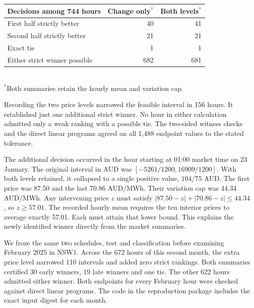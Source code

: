 \begin{center}
\begin{tabular}{lrr}
\toprule
Decisions among 744 hours & Change only$^*$ & Both levels$^*$\\
\midrule
First half strictly better & 40 & 41\\
Second half strictly better & 21 & 21\\
Exact tie & 1 & 1\\
Either strict winner possible & 682 & 681\\
\bottomrule
\end{tabular}\\[3pt]
{\small $^*$Both summaries retain the hourly mean and variation cap.}
\end{center}

Recording the two price levels narrowed the feasible interval in 156 hours. It established just one additional strict winner. No hour in either calculation admitted only a weak ranking with a possible tie. The two-sided witness checks and the direct linear programs agreed on all 1,488 endpoint values to the stated tolerance.

The additional decision occurred in the hour starting at 01:00 market time on 23 January. The original interval in AUD was $[-5261/1200,16909/1200]$. With both levels retained, it collapsed to a single positive value, $104/75$ AUD. The first price was 87.50 and the last 70.86 AUD/MWh. Their variation cap was 44.34 AUD/MWh. Any intervening price $z$ must satisfy $|87.50-z|+|70.86-z|\le44.34$, so $z\ge57.01$. The recorded hourly mean requires the ten interior prices to average exactly 57.01. Each must attain that lower bound. This explains the newly identified winner directly from the market summaries.

We froze the same two schedules, test and classification before examining February 2025 in NSW1. Across the 672 hours of this second month, the extra price level narrowed 110 intervals and added zero strict rankings. Both summaries certified 30 early winners, 19 late winners and one tie. The other 622 hours admitted either winner. Both endpoints for every February hour were checked against direct linear programs. The code in the reproduction package includes the exact input digest for each month.
